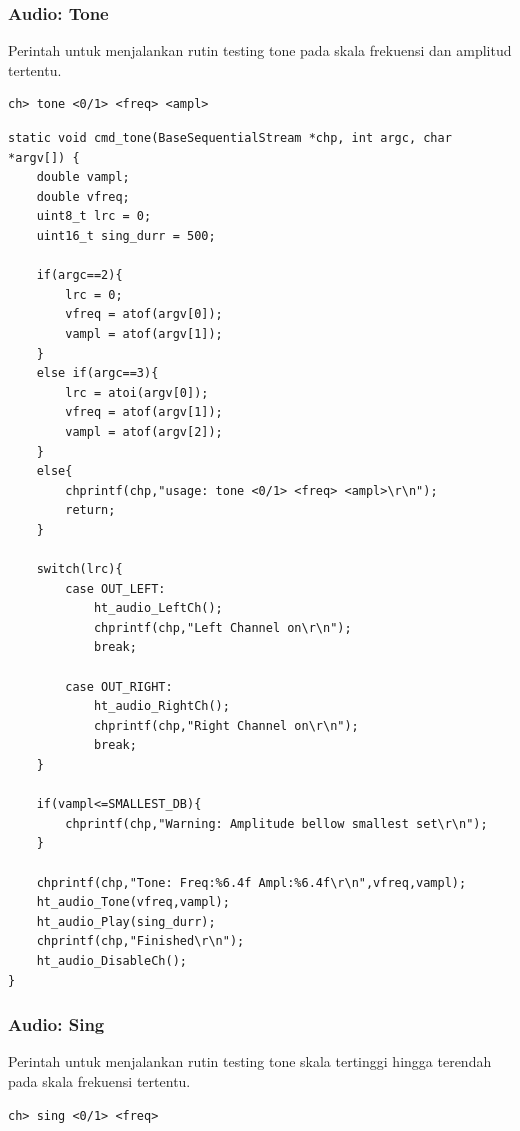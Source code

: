 \documentclass[12pt,]{article}
\begin{document}
	\subsubsection{Audio: Tone}
	Perintah untuk menjalankan rutin testing tone pada skala frekuensi dan amplitud tertentu.
	\begin{verbatim}
ch> tone <0/1> <freq> <ampl>
	\end{verbatim}

	\begin{verbatim}
static void cmd_tone(BaseSequentialStream *chp, int argc, char *argv[]) {
	double vampl;
	double vfreq;
	uint8_t lrc = 0;
	uint16_t sing_durr = 500;
	
	if(argc==2){
		lrc = 0;
		vfreq = atof(argv[0]);
		vampl = atof(argv[1]);
	}
	else if(argc==3){
		lrc = atoi(argv[0]);
		vfreq = atof(argv[1]);
		vampl = atof(argv[2]);
	}
	else{
		chprintf(chp,"usage: tone <0/1> <freq> <ampl>\r\n");
		return;
	}
	
	switch(lrc){
		case OUT_LEFT:
			ht_audio_LeftCh();
			chprintf(chp,"Left Channel on\r\n");
			break;
		
		case OUT_RIGHT:
			ht_audio_RightCh();
			chprintf(chp,"Right Channel on\r\n");
			break;
	}
	
	if(vampl<=SMALLEST_DB){
		chprintf(chp,"Warning: Amplitude bellow smallest set\r\n");
	}
	
	chprintf(chp,"Tone: Freq:%6.4f Ampl:%6.4f\r\n",vfreq,vampl);
	ht_audio_Tone(vfreq,vampl);
	ht_audio_Play(sing_durr);
	chprintf(chp,"Finished\r\n");
	ht_audio_DisableCh();
}
	\end{verbatim}
	
	\subsubsection{Audio: Sing}
	Perintah untuk menjalankan rutin testing tone skala tertinggi hingga terendah pada skala frekuensi tertentu.
	\begin{verbatim}
ch> sing <0/1> <freq>
	\end{verbatim}
	
\end{document}

